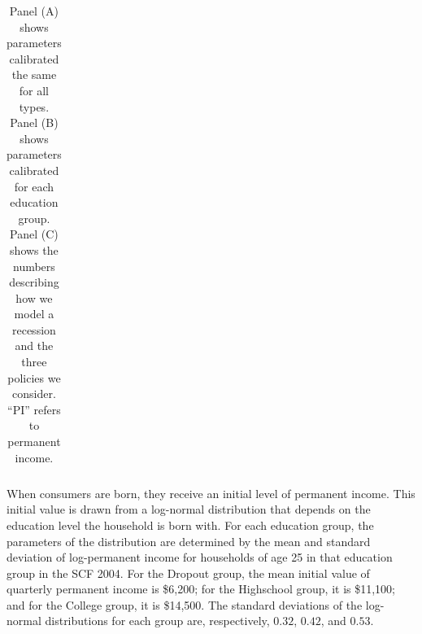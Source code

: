 \documentclass[\econtexRoot/HAFiscal]{subfiles}
\begin{document}
{\begin{table}[p]
\begin{center}
\begin{tabular}{l}
      \end{tabular}
    \end{center}
    \caption{Panel (A) shows parameters calibrated the same for all types. Panel (B) shows parameters calibrated for each education group. Panel (C) shows the numbers describing how we model a recession and the three policies we consider. ``PI'' refers to permanent income.}
    \notinsubfile{\label{tab:calibration}}
  \end{table}
  \clearpage
}


When consumers are born, they receive an initial level of permanent income. This initial value is drawn from a log-normal distribution that depends on the education level the household is born with. For each education group, the parameters of the distribution are determined by the mean and standard deviation of log-permanent income for households of age 25 in that education group in the SCF 2004. For the Dropout group, the mean initial value of quarterly permanent income is \$6,200; for the Highschool group, it is \$11,100; and for the College group, it is \$14,500. The standard deviations of the log-normal distributions for each group are, respectively, $0.32$, $0.42$, and $0.53$. 
\end{document}
